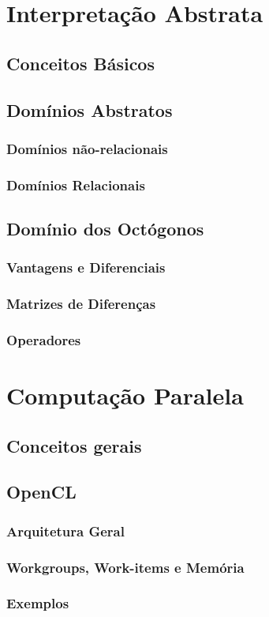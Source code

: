 \chapter{Interpretação Abstrata} \label{fundamentacao_ia}
    \section{Conceitos Básicos}
    \section{Domínios Abstratos}
        \subsection{Domínios não-relacionais}
        \subsection{Domínios Relacionais}
    \section{Domínio dos Octógonos}
        \subsection{Vantagens e Diferenciais}
        \subsection{Matrizes de Diferenças}
        \subsection{Operadores}


\chapter{Computação Paralela} \label{fundamentacao_cl}
    \section{Conceitos gerais}
    \section{OpenCL}
        \subsection{Arquitetura Geral}
        \subsection{Workgroups, Work-items e Memória}
        \subsection{Exemplos}
        